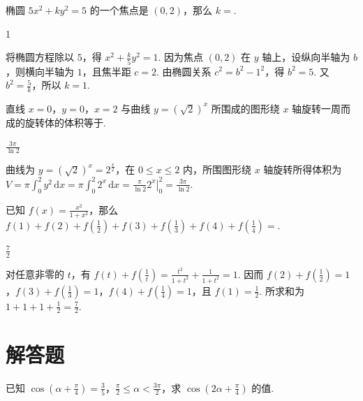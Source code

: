 \begin{problem}
椭圆 \(5x^{2} + ky^{2} = 5\) 的一个焦点是 \((0, 2)\)，那么 \(k =\)\fillinblank{}.
\end{problem}

\begin{answer}
1
\end{answer}

\begin{solution}
将椭圆方程除以 \(5\)，得 \(x^{2}+\frac{k}{5}y^{2}=1\). 因为焦点 \((0,2)\) 在 \(y\) 轴上，设纵向半轴为 \(b\)，则横向半轴为 \(1\)，且焦半距 \(c=2\). 由椭圆关系 \(c^{2}=b^{2}-1^{2}\)，得 \(b^{2}=5\). 又 \(b^{2}=\frac{5}{k}\)，所以 \(k=1\).
\end{solution}

\begin{problem}
直线 \(x = 0\)，\(y = 0\)，\(x = 2\) 与曲线 \(y = (\sqrt{2})^{x}\) 所围成的图形绕 \(x\) 轴旋转一周而成的旋转体的体积等于\fillinblank{}.
\end{problem}

\begin{answer}
\(\frac{3\pi}{\ln 2}\)
\end{answer}

\begin{solution}
曲线为 \(y=(\sqrt{2})^{x}=2^{\frac{x}{2}}\)，在 \(0\leqslant x\leqslant2\) 内，所围图形绕 \(x\) 轴旋转所得体积为
\(V=\pi\int_{0}^{2}y^{2}\,\mathrm{d}x=\pi\int_{0}^{2}2^{x}\,\mathrm{d}x=\frac{\pi}{\ln2}\left.2^{x}\right|_{0}^{2}=\frac{3\pi}{\ln2}\).
\end{solution}

\begin{problem}
已知 \(f(x) = \frac{x^2}{1 + x^2}\)，那么 \(f(1) + f(2) + f\left(\frac{1}{2}\right) + f(3) + f\left(\frac{1}{3}\right) + f(4) + f\left(\frac{1}{4}\right) =\)\fillinblank{}.
\end{problem}

\begin{answer}
\(\frac{7}{2}\)
\end{answer}

\begin{solution}
对任意非零的 \(t\)，有 \(f(t)+f\left(\frac{1}{t}\right)=\frac{t^{2}}{1+t^{2}}+\frac{1}{1+t^{2}}=1\). 因而
\(f(2)+f\left(\frac{1}{2}\right)=1\)，\(f(3)+f\left(\frac{1}{3}\right)=1\)，\(f(4)+f\left(\frac{1}{4}\right)=1\)，且 \(f(1)=\frac{1}{2}\). 所求和为 \(1+1+1+\frac{1}{2}=\frac{7}{2}\).
\end{solution}

\section{解答题}
\begin{problem}
已知 \(\cos \left( \alpha + \frac{\pi}{4} \right) = \frac{3}{5}\)，\(\frac{\pi}{2} \leqslant \alpha < \frac{3\pi}{2}\)，求 \(\cos \left(2\alpha + \frac{\pi}{4}\right)\) 的值.
\end{problem}

